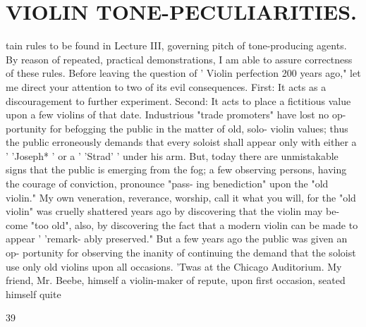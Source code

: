 \documentclass{article}
\begin{document}
\section*{VIOLIN TONE-PECULIARITIES.}
tain rules to be found in Lecture III, governing pitch of tone-producing agents. By reason of repeated, practical demonstrations, I am able to assure correctness of these rules. Before leaving the question of ' Violin perfection 200 years ago," let me direct your attention to two of its evil consequences. First: It acts as a discouragement to further experiment. Second: It acts to place a fictitious value upon a few violins of that date. Industrious "trade promoters" have lost no op- portunity for befogging the public in the matter of old, solo- violin values; thus the public erroneously demands that every soloist shall appear only with either a ' 'Joseph* ' or a ' 'Strad' ' under his arm. But, today there are unmistakable signs that the public is emerging from the fog; a few observing persons, having the courage of conviction, pronounce "pass- ing benediction" upon the "old violin." My own veneration, reverance, worship, call it what you will, for the "old violin" was cruelly shattered years ago by discovering that the violin may be- come "too old", also, by discovering the fact that a modern violin can be made to appear ' 'remark- ably preserved." But a few years ago the public was given an op- portunity for observing the inanity of continuing the demand that the soloist use only old violins upon all occasions. 'Twas at the Chicago Auditorium. My friend, Mr. Beebe, himself a violin-maker of repute, upon first occasion, seated himself quite

39
\end{document}
